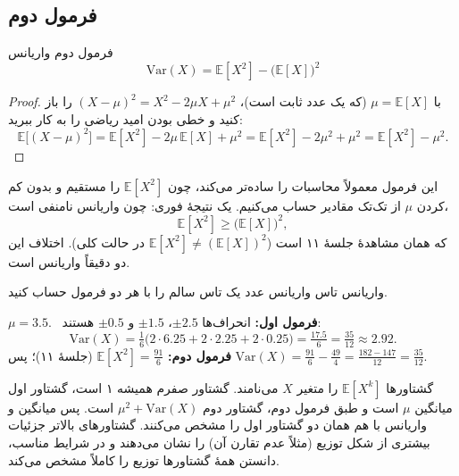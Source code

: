 \subsection{فرمول دوم}

\begin{theorem}[label=thm:var-second]{فرمول دوم واریانس}
  \[ \boxed{\ \mathrm{Var}(X)=\mathbb E[X^2]-\bigl(\mathbb E[X]\bigr)^2\ } \]
\end{theorem}

\begin{proof}
  با $\mu=\mathbb E[X]$ (که یک عدد ثابت است)، $(X-\mu)^2=X^2-2\mu X+\mu^2$ را باز کنید و خطی بودن امید ریاضی را به کار ببرید:
  \[ \mathbb E\bigl[(X-\mu)^2\bigr]=\mathbb E[X^2]-2\mu\,\mathbb E[X]+\mu^2=\mathbb E[X^2]-2\mu^2+\mu^2=\mathbb E[X^2]-\mu^2. \]
\end{proof}

این فرمول معمولاً محاسبات را ساده‌تر می‌کند، چون $\mathbb E[X^2]$ را مستقیم و بدون کم کردن $\mu$ از تک‌تک مقادیر حساب می‌کنیم. \newline یک نتیجهٔ فوری: چون واریانس نامنفی است،
\[ \mathbb E[X^2]\ge\bigl(\mathbb E[X]\bigr)^2, \]
که همان مشاهدهٔ جلسهٔ ۱۱ است ($\mathbb E[X^2]\ne(\mathbb E[X])^2$ در حالت کلی). اختلاف این دو دقیقاً واریانس است.

\begin{example}[label=ex:var-die]{واریانس تاس}
  واریانس عدد یک تاس سالم را با هر دو فرمول حساب کنید.
  \begin{solution}
    $\mu=3.5$. \ \textbf{فرمول اول:} انحراف‌ها $\pm2.5$، $\pm1.5$ و $\pm0.5$ هستند:
    \[ \mathrm{Var}(X)=\tfrac16\bigl(2\cdot6.25+2\cdot2.25+2\cdot0.25\bigr)=\tfrac{17.5}{6}=\tfrac{35}{12}\approx2.92. \]
    \textbf{فرمول دوم:} $\mathbb E[X^2]=\frac{91}{6}$ (جلسهٔ ۱۱)؛ پس $\mathrm{Var}(X)=\frac{91}{6}-\frac{49}{4}=\frac{182-147}{12}=\frac{35}{12}$.
  \end{solution}
\end{example}

\begin{moreinfo}{گشتاورها}
  $\mathbb E[X^k]$ را  متغیر $X$ می‌نامند. گشتاور صفرم همیشه ۱ است، گشتاور اول میانگین $\mu$ است و طبق فرمول دوم، گشتاور دوم $\mu^2+\mathrm{Var}(X)$ است. پس میانگین و واریانس با هم همان دو گشتاور اول را مشخص می‌کنند. گشتاورهای بالاتر جزئیات بیشتری از شکل توزیع (مثلاً عدم تقارن آن) را نشان می‌دهند و در شرایط مناسب، دانستن همهٔ گشتاورها توزیع را کاملاً مشخص می‌کند.
\end{moreinfo}

